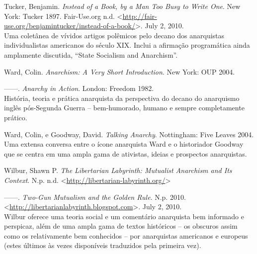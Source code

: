 \begin{hangparas}{0.25in}{1}
Tucker, Benjamin. \emph{Instead of a Book, by a Man Too Busy to Write One}. New York: Tucker 1897. Fair-Use.org n.d. <\url{http://fair-use.org/benjamintucker/instead-of-a-book/}>. July 2, 2010.\smallskip\\
Uma coletânea de vívidos artigos polêmicos pelo decano dos anarquistas individualistas americanos do século XIX. Inclui a afirmação programática ainda amplamente discutida, ``State Socialism and Anarchism''.

Ward, Colin. \emph{Anarchism: A Very Short Introduction}. New York: OUP 2004.

------. \emph{Anarchy in Action}. London: Freedom 1982.\smallskip\\
História, teoria e prática anarquista da perspectiva do decano do anarquismo inglês pós-Segunda Guerra -- bem-humorado, humano e sempre completamente prático.

Ward, Colin, e Goodway, David. \emph{Talking Anarchy}. Nottingham: Five Leaves 2004.\smallskip\\
Uma extensa conversa entre o ícone anarquista Ward e o historiador Goodway que se centra em uma ampla gama de ativistas, ideias e prospectos anarquistas.

Wilbur, Shawn P. \emph{The Libertarian Labyrinth: Mutualist Anarchism and Its Context}. N.p. n.d. <\url{http://libertarian-labyrinth.org/}>

------. \emph{Two-Gun Mutualism and the Golden Rule}. N.p. 2010. <\url{http://libertarianlabyrinth.blogspot.com}>. July 2, 2010.\smallskip\\
Wilbur oferece uma teoria social e um comentário anarquista bem informado e perspicaz, além de uma ampla gama de textos históricos -- os obscuros assim como os relativamente bem conhecidos -- por anarquistas americanos e europeus (estes últimos às vezes disponíveis traduzidos pela primeira vez).
\end{hangparas}